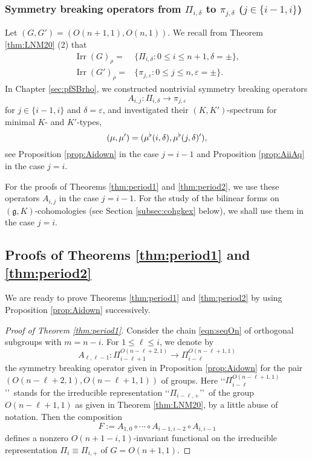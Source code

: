 \subsubsection{Symmetry breaking operators from $\Pi_{i,\delta}$
 to $\pi_{j,\delta}$
($j \in \{i-1,i\}$)}
\label{subsec:KKPipj}
Let $(G,G')=(O(n+1,1),O(n,1))$.  
We recall from Theorem \ref{thm:LNM20} (2)
 that 
\begin{align*}
{\operatorname{Irr}}(G)_{\rho} = 
&\{\Pi_{i,\delta} : 0 \le i \le n+1, \delta=\pm\}, 
\\
{\operatorname{Irr}}(G')_{\rho} = 
&\{\pi_{j,\varepsilon} : 0 \le j \le n, \varepsilon=\pm\}.  
\end{align*}
In Chapter \ref{sec:pfSBrho},
 we constructed nontrivial symmetry breaking operators
\[
  A_{i,j} \colon \Pi_{i,\delta} \to \pi_{j,\varepsilon}
\]
for $j \in \{i-1,i\}$
 and $\delta = \varepsilon$, 
 and investigated their $(K,K')$-spectrum
 for minimal $K$- and $K'$-types, 
\[
  (\mu,\mu')=(\mu^{\flat}(i,\delta),\mu^{\flat}(j,\delta)'), 
\]
see Proposition \ref{prop:Aidown} in the case $j=i-1$
 and Proposition \ref{prop:AiiAq} in the case $j=i$.  



For the proofs of Theorems \ref{thm:period1} and \ref{thm:period2},
 we use these operators $A_{i,j}$ in the case $j=i-1$.  
For the study of the bilinear forms
 on $({\mathfrak{g}},K)$-cohomologies
 (see Section \ref{subsec:cohgkex} below), 
 we shall use them in the case $j=i$.  







\subsection{Proofs of Theorems \ref{thm:period1} and \ref{thm:period2}}
\label{subsec:pfperiod}
We are ready to prove Theorems \ref{thm:period1} and \ref{thm:period2}
  by using Proposition \ref{prop:Aidown} successively.  
\begin{proof}
[Proof of Theorem \ref{thm:period1}]
Consider the chain \eqref{eqn:seqOn}
 of orthogonal subgroups 
 with $m=n-i$.  
For $1 \le \ell \le i$, 
 we denote by
\[
   A_{\ell, \ell-1}
   \colon
   \Pi_{i-\ell+1}^{O(n-\ell+2,1)} \to \Pi_{i-\ell}^{O(n-\ell+1,1)}
\]
 the symmetry breaking operator given in Proposition \ref{prop:Aidown}
 for the pair 
 $(O(n-\ell+2,1), O(n-\ell+1,1))$ of groups.  
Here \lq\lq{$\Pi_{i-\ell}^{O(n-\ell+1,1)}$}\rq\rq\ stands
 for the irreducible representation \lq\lq{$\Pi_{i-\ell,+}$}\rq\rq\
 of the group $O(n-\ell+1,1)$
 as given in Theorem \ref{thm:LNM20}, 
 by a little abuse of notation.  
Then the composition
\begin{equation}
\label{eqn:compfunct}
  F:= A_{1,0} \circ \cdots \circ A_{i-1,i-2} \circ A_{i,i-1}
\end{equation}
defines a nonzero $O(n+1-i,1)$-invariant functional
 on the irreducible representation $\Pi_i \equiv \Pi_{i,+}$
 of $G=O(n+1,1)$.  
\end{proof}

